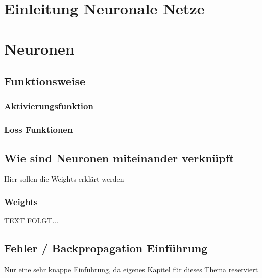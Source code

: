 \newpage
\thispagestyle{empty}
\section{Einleitung Neuronale Netze}\label{sec:einleitung_nn}   

\vspace{1cm}




\newpage  
\section{Neuronen}\label{sec:neuronen}
  
\newpage
\subsection{Funktionsweise}\label{subsec:neuronen:funktionsweise}
  
 
\subsubsection{Aktivierungsfunktion}\label{subsec:neuronen:aktivierungsfunktion}
   

\subsubsection{Loss Funktionen}

\newpage


\subsection{Wie sind Neuronen miteinander verknüpft}\label{subsec:neuronen:verknuepfung_neuronen}  
%
Hier sollen die Weights erklärt werden

\subsubsection{Weights}\label{Weights}
  TEXT FOLGT... 

\subsection{Fehler / Backpropagation Einführung}\label{subsec:neuronen:fehler_backpropagation}
Nur eine sehr knappe Einführung, da eigenes Kapitel für dieses Thema reserviert

